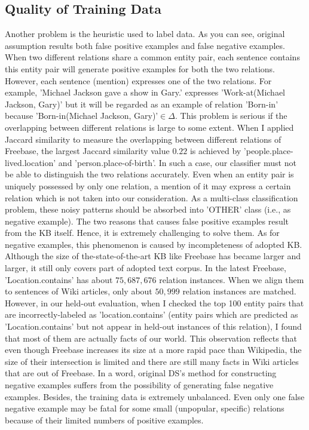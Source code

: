 \documentclass[10pt]{article} %
\theoremstyle{definition}
\theoremstyle{definition}
\begin{document}
\subsection{Quality of Training Data}
Another problem is the heuristic used to label data. 
As you can see, original assumption results both false positive examples and false negative examples. 
When two different relations share a common entity pair, each sentence contains this entity pair will generate positive examples for both the two relations. 
However, each sentence (mention) expresses one of the two relations. 
For example, 'Michael Jackson gave a show in Gary.' expresses 'Work-at(Michael Jackson, Gary)' but it will be regarded as an example of relation 'Born-in' because 'Born-in(Michael Jackson, Gary)'$\in\Delta$. 
This problem is serious if the overlapping between different relations is large to some extent. 
When I applied Jaccard similarity to measure the overlapping between different relations of Freebase, 
the largest Jaccard similarity value $0.22$ is achieved by 'people.place-lived.location' and 'person.place-of-birth'. 
In such a case, our classifier must not be able to distinguish the two relations accurately. 
Even when an entity pair is uniquely possessed by only one relation, a mention of it may express a certain relation which is not taken into our consideration. 
As a multi-class classification problem, these noisy patterns should be absorbed into 'OTHER' class (i.e., as negative example). 
The two reasons that causes false positive examples result from the KB itself.
Hence, it is extremely challenging to solve them. 
As for negative examples, this phenomenon is caused by incompleteness of adopted KB. 
Although the size of the-state-of-the-art KB like Freebase has became larger and larger, it still only covers part of adopted text corpus. 
In the latest Freebase, 'Location.contains' has about $75,687,676$ relation instances. 
When we align them to sentences of Wiki articles, only about $50,999$ relation instances are matched. 
However, in our held-out evaluation, when I checked the top 100 entity pairs that are incorrectly-labeled as 'location.contains' 
(entity pairs which are predicted as 'Location.contains' but not appear in held-out instances of this relation), 
I found that most of them are actually facts of our world. 
This observation reflects that even though Freebase increases its size at a more rapid pace than Wikipedia, 
the size of their intersection is limited and there are still many facts in Wiki articles that are out of Freebase. 
In a word, original DS's method for constructing negative examples suffers from the possibility of generating false negative examples. 
Besides, the training data is extremely unbalanced. 
Even only one false negative example may be fatal for some small (unpopular, specific) relations because of their limited numbers of positive examples. 
\end{document}
